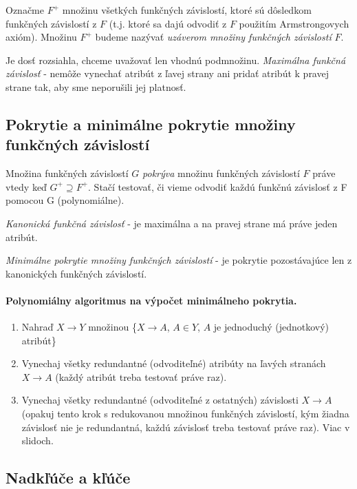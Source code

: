 \documentclass[10pt,a4paper]{article}
\begin{document}
Označme $F^+$ množinu všetkých funkčných závislostí,
ktoré sú dôsledkom funkčných závislostí z $F$ (t.j. ktoré sa dajú
odvodiť z $F$ použitím Armstrongovych axióm). Množinu $F^+$ budeme
nazývať \emph{uzáverom množiny funkčných závislostí} $F$.

Je dosť rozsiahla, chceme uvažovať len vhodnú podmnožinu. 
\emph{Maximálna funkčná závislosť} - nemôže vynechať atribút z ľavej strany ani pridať atribút k pravej strane tak, aby sme neporušili jej platnosť. 

\subsection{Pokrytie a minimálne pokrytie množiny funkčných závislostí}
Množina funkčných závislostí $G$ \emph{pokrýva} množinu funkčných závislostí $F$ práve vtedy keď $G^+ \supseteq F^+$. 
Stačí testovať, či vieme odvodiť každú funkčnú závislosť z F pomocou G (polynomiálne).     

\emph{Kanonická funkčná závislosť} - je maximálna a na pravej strane má práve jeden atribút.     

\emph{Minimálne pokrytie množiny funkčných závislostí} - je pokrytie pozostávajúce len z kanonických funkčných závislostí. 

\paragraph{Polynomiálny algoritmus na výpočet minimálneho pokrytia.}
\begin{enumerate}
\item Nahraď $X \rightarrow Y$ množinou \{$X \rightarrow A$, $A \in Y$, $A$ je jednoduchý (jednotkový) atribút\}
\item Vynechaj všetky redundantné (odvoditeľné) atribúty na ľavých stranách
$X \rightarrow A$ (každý atribút treba testovať práve raz). 
\item Vynechaj všetky redundantné (odvoditeľné z ostatných) závislosti $X \rightarrow A$ (opakuj tento
krok s redukovanou množinou funkčných závislostí, kým
žiadna závislosť nie je redundantná, každú závislosť treba
testovať práve raz). Viac v slidoch. 

\end{enumerate}

\subsection{Nadkľúče a kľúče}
\end{document}
